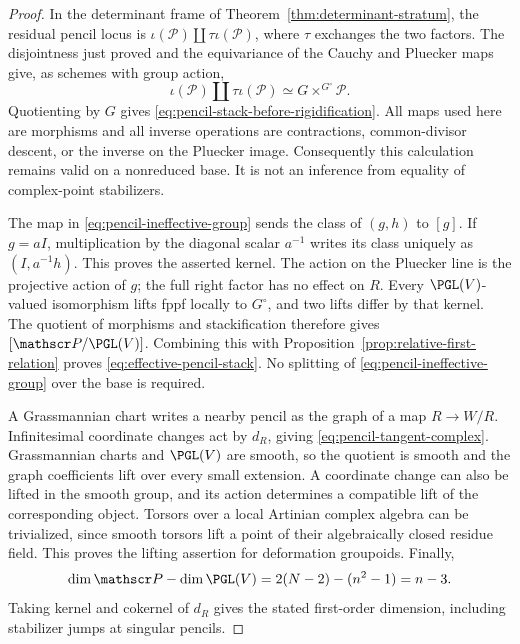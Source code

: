 \documentclass[11pt,reqno]{amsart}
\numberwithin{equation}{section}
\theoremstyle{definition}\newtheorem{definition}[theorem]{Definition}
\theoremstyle{remark}\newtheorem{remark}[theorem]{Remark}
\begin{document}
\begin{proof}
In the determinant frame of
Theorem~\ref{thm:determinant-stratum}, the residual pencil locus is
\(\iota(\mathscr P)\amalg\tau\iota(\mathscr P)\), where
\(\tau\) exchanges the two factors.  The disjointness just proved
and the equivariance of the Cauchy and Pluecker maps give, as
schemes with group action,
\[
 \iota(\mathscr P)\amalg\tau\iota(\mathscr P)
                         \simeq G\times^{G^\circ}\mathscr P.
\]
Quotienting by \(G\) gives
\eqref{eq:pencil-stack-before-rigidification}.  All maps used here
are morphisms and all inverse operations are contractions,
common-divisor descent, or the inverse on the Pluecker image.
Consequently this calculation remains valid on a nonreduced base.
It is not an inference from equality of complex-point stabilizers.

The map in \eqref{eq:pencil-ineffective-group} sends the class of
\((g,h)\) to \([g]\).  If \(g=aI\), multiplication by the diagonal
scalar \(a^{-1}\) writes its class uniquely as \((I,a^{-1}h)\).
This proves the asserted kernel.  The action on the Pluecker line
is the projective action of \(g\); the full right factor has no
effect on \(R\).  Every \(\PGL(V)\)-valued isomorphism lifts fppf
locally to \(G^\circ\), and two lifts differ by that kernel.
The quotient of morphisms and stackification therefore gives
\([\mathscr P/\PGL(V)]\).  Combining this with
Proposition~\ref{prop:relative-first-relation} proves
\eqref{eq:effective-pencil-stack}.  No splitting of
\eqref{eq:pencil-ineffective-group} over the base is required.

A Grassmannian chart writes a nearby pencil as the graph of a map
\(R\to W/R\).  Infinitesimal coordinate changes act by \(d_R\),
giving \eqref{eq:pencil-tangent-complex}.  Grassmannian charts and
\(\PGL(V)\) are smooth, so the quotient is smooth and the graph
coefficients lift over every small extension.  A coordinate change
can also be lifted in the smooth group, and its action determines
a compatible lift of the corresponding object.  Torsors over a local
Artinian complex algebra can be trivialized, since smooth torsors
lift a point of their algebraically closed residue field.
This proves the lifting assertion for deformation groupoids.
Finally,
\[
 \dim\mathscr P-\dim\PGL(V)=2(N-2)-(n^2-1)=n-3.
\]
Taking kernel and cokernel of \(d_R\) gives the stated first-order
dimension, including stabilizer jumps at singular pencils.
\end{proof}
\end{document}

